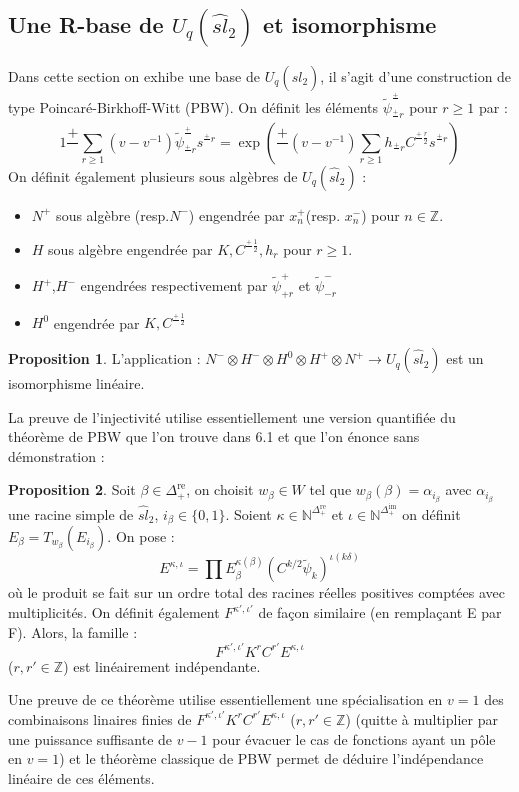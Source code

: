 \documentclass[12pt]{article}
\theoremstyle{definition}
\newtheorem{Prop}{Proposition}[section]
\begin{document}
\subsection{Une R-base de  $U_q(\widehat{sl}_{2})$ et isomorphisme}
Dans cette section on exhibe une base de $U_q(\widehat{sl}_{2})$, il s'agit d'une construction de type Poincaré-Birkhoff-Witt (PBW). On définit les éléments $\tilde{\psi}^{\frac{+}{}}_{\frac{+}{}r}$ pour $r\geqslant 1$ par : $$1\frac{+}{}\underset{r\geqslant 1}{\sum}(v-v^{-1})\widetilde{\psi}^{\frac{+}{}}_{\frac{+}{}r}s^{\frac{+}{}r}=\exp\left(\frac{+}{}(v-v^{-1})\underset{r\geqslant 1}{\sum}h_{\frac{+}{}r}C^{\frac{+}{}\frac{r}{2}}s^{\frac{+}{}r}\right)$$ On définit également plusieurs sous algèbres de  $U_q(\widehat{sl}_{2})$ :
\begin{itemize}
\item $N^+$ sous algèbre (resp.$N^-$) engendrée par $x_n^+$(resp. $x_n^-$) pour $n\in\mathbb{Z}$.
\item $H$ sous algèbre engendrée par $K,C^{\frac{+}{}\frac{1}{2}},h_r$ pour $r\geqslant 1$. 
\item $H^+$,$H^-$ engendrées respectivement par $\tilde{\psi}^+_{+r}$ et $\tilde{\psi}^-_{-r}$
\item $H^0$ engendrée par  $K,C^{\frac{+}{}\frac{1}{2}}$
\end{itemize}
\begin{Prop}\label{Rbase} L'application : $N^-\otimes H^-\otimes H^0\otimes H^+\otimes N^+\to U_q(\widehat{sl}_{2})$ est un isomorphisme linéaire. \end{Prop} 

La preuve de l'injectivité utilise essentiellement une version quantifiée du théorème de PBW que l'on trouve dans \cite{Beck} 6.1 et que l'on énonce sans démonstration :
\begin{Prop}\label{qPBW}
Soit $\beta\in\Delta^{\mbox{re}}_{+}$, on choisit $w_{\beta}\in W$ tel que $w_{\beta}(\beta)=\alpha_{i_\beta}$ avec $\alpha_{i_\beta}$ une racine simple de $\widehat{sl}_{2}$, $i_\beta\in\{0,1\}$. Soient $\kappa\in\mathbb{N}^{\Delta^{\mbox{re}}_{+}}$ et $\iota\in\mathbb{N}^{\Delta^{\mbox{im}}_{+}}$ on définit $E_\beta=T_{w_\beta}(E_{i_\beta})$.  On pose : $$E^{\kappa, \iota}=\prod E^{\kappa(\beta)}_{\beta}\left(C^{k/2}\widetilde{\psi}_{k}\right)^{\iota(k\delta)}$$ où le produit se fait sur un ordre total des racines réelles positives comptées avec multiplicités. On définit également $F^{\kappa', \iota'}$ de façon similaire (en remplaçant E par F). Alors, la famille : $$F^{\kappa', \iota'}K^rC^{r'}E^{\kappa, \iota}$$ ($r,r'\in\mathbb{Z}$) est linéairement indépendante. 
\end{Prop}
Une preuve de ce théorème utilise essentiellement une spécialisation en $v=1$ des combinaisons linaires finies de $F^{\kappa', \iota'}K^rC^{r'}E^{\kappa, \iota}$ ($r,r'\in\mathbb{Z}$) (quitte à multiplier par une puissance suffisante de $v-1$ pour évacuer le cas de fonctions ayant un pôle en $v=1$) et le théorème classique de PBW permet de déduire l'indépendance linéaire de ces éléments. 
\end{document}

